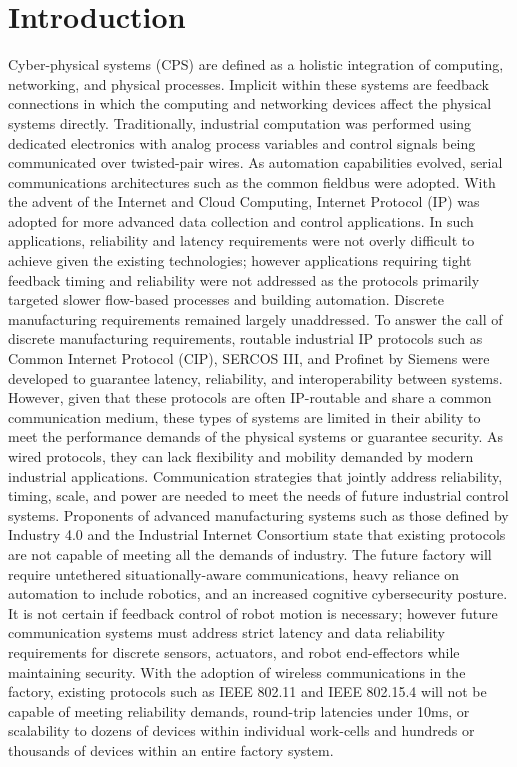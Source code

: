 \chapter{Introduction}\label{chapter:intro}

\chapterintro*
Cyber-physical systems (CPS) are defined as a holistic integration of computing, networking, and physical processes.  Implicit within these systems are feedback connections in which the computing and networking devices affect the physical systems directly.  Traditionally, industrial computation was performed using dedicated electronics with analog process variables and control signals being communicated over twisted-pair wires.  As automation capabilities evolved, serial communications architectures such as the common fieldbus were adopted.  With the advent of the Internet and Cloud Computing, Internet Protocol (IP) was adopted for more advanced data collection and control applications.  In such applications, reliability and latency requirements were not overly difficult to achieve given the existing technologies; however applications requiring tight feedback timing and reliability were not addressed as the protocols primarily targeted slower flow-based processes and building automation.  Discrete manufacturing requirements remained largely unaddressed.  To answer the call of discrete manufacturing requirements, routable industrial IP protocols such as Common Internet Protocol (CIP), SERCOS III, and Profinet by Siemens were developed to guarantee latency, reliability, and interoperability between systems.  However, given that these protocols are often IP-routable and share a common communication medium, these types of systems are limited in their ability to meet the performance demands of the physical systems or guarantee security.   As wired protocols, they can lack flexibility and mobility demanded by modern industrial applications.
Communication strategies that jointly address reliability, timing, scale, and power are needed to meet the needs of future industrial control systems.  Proponents of advanced manufacturing systems such as those defined by Industry 4.0 and the Industrial Internet Consortium state that existing protocols are not capable of meeting all the demands of industry.  The future factory will require untethered situationally-aware communications, heavy reliance on automation to include robotics, and an increased cognitive cybersecurity posture.  It is not certain if feedback control of robot motion is necessary; however future communication systems must address strict latency and data reliability requirements for discrete sensors, actuators, and robot end-effectors while maintaining security.  With the adoption of wireless communications in the factory, existing protocols such as IEEE 802.11 and IEEE 802.15.4 will not be capable of meeting reliability demands, round-trip latencies under 10ms, or scalability to dozens of devices within individual work-cells and hundreds or thousands of devices within an entire factory system.    

